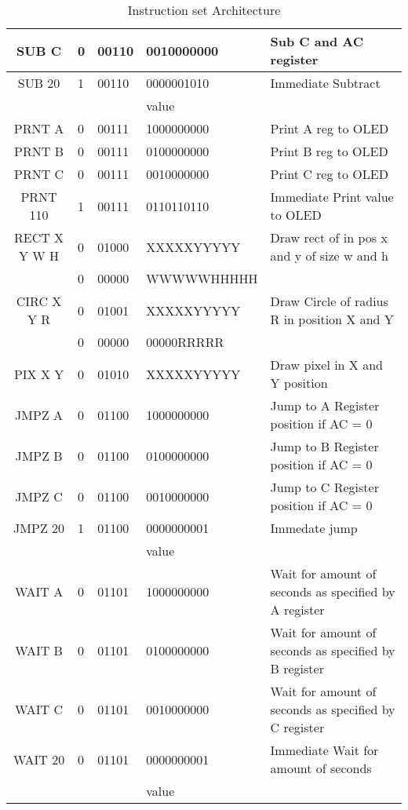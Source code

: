 \documentclass[a4paper]{article}
\begin{document}
\begin{table}[h]
\begin{tabular}{|c|l|l|l|p{6cm}|}
SUB C & 0 & 00110 & 0010000000 & Sub C and AC register\\ \hline
SUB 20 & 1 & 00110 & 0000001010 & Immediate Subtract\\ 
&  &  & value  & \\ \hline
PRNT A & 0 & 00111 & 1000000000 & Print A reg to OLED \\ \hline
PRNT B & 0 & 00111 & 0100000000 & Print B reg to OLED \\ \hline
PRNT C & 0 & 00111 & 0010000000 & Print C reg to OLED\\ \hline
PRNT 110 & 1 & 00111 & 0110110110 & Immediate Print value to OLED\\ \hline
RECT X Y W H & 0 & 01000 & XXXXXYYYYY & Draw rect of in pos x and y of size w and h\\ 
& 0 & 00000 & WWWWWHHHHH &\\ \hline 
CIRC X Y R & 0 & 01001 & XXXXXYYYYY & Draw Circle of radius R in position X and Y\\ 
& 0 & 00000 & 00000RRRRR & \\ \hline
PIX X Y & 0 & 01010 & XXXXXYYYYY & Draw pixel in X and Y position\\ \hline
JMPZ A & 0 & 01100 & 1000000000 & Jump to A Register position if AC = 0\\ \hline
JMPZ B & 0 & 01100 & 0100000000 & Jump to B Register position if AC = 0\\ \hline
JMPZ C & 0 & 01100 & 0010000000 & Jump to C Register position if AC = 0\\ \hline
JMPZ 20 & 1 & 01100 & 0000000001 & Immedate jump \\ 
&  &  & value  & \\ \hline
WAIT A & 0 & 01101 & 1000000000 & Wait for amount of seconds as specified by A register\\ \hline
WAIT B & 0 & 01101 & 0100000000 &  Wait for amount of seconds as specified by B register\\ \hline
WAIT C & 0 & 01101 & 0010000000 &  Wait for amount of seconds as specified by C register\\ \hline
WAIT 20 & 0 & 01101 & 0000000001 &  Immediate Wait for amount of seconds \\ 
&  &  & value  & \\ \hline
\end{tabular}
\caption{Instruction set Architecture}
\end{table}
\end{document}
